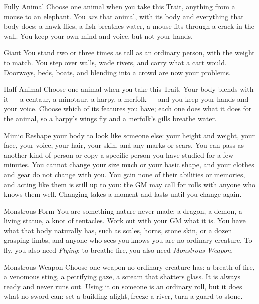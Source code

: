 \begin{feat}{Fully Animal}
Choose one animal when you take this Trait, anything from a mouse to an
elephant. You \emph{are} that animal, with its body and everything that
body does: a hawk flies, a fish breathes water, a mouse fits through a
crack in the wall. You keep your own mind and voice, but not your
hands.
\end{feat}

\begin{feat}{Giant}
You stand two or three times as tall as an ordinary person, with the
weight to match. You step over walls, wade rivers, and carry what a
cart would. Doorways, beds, boats, and blending into a crowd are now
your problems.
\end{feat}

\begin{feat}{Half Animal}
Choose one animal when you take this Trait. Your body blends with
it --- a centaur, a minotaur, a harpy, a merfolk --- and you keep your
hands and your voice. Choose which of its features you have; each one
does what it does for the animal, so a harpy's wings fly and a
merfolk's gills breathe water.
\end{feat}

\begin{feat}{Mimic}
Reshape your body to look like someone else: your height and weight,
your face, your voice, your hair, your skin, and any marks or scars.
You can pass as another kind of person or copy a specific person you
have studied for a few minutes. You cannot change your size much or
your basic shape, and your clothes and gear do not change with you.
You gain none of their abilities or memories, and acting like them is
still up to you: the GM may call for  rolls with anyone
who knows them well. Changing takes a moment and lasts until you
change again.
\end{feat}

\begin{feat}{Monstrous Form}
You are something nature never made: a dragon, a demon, a living
statue, a knot of tentacles. Work out with your GM what it is. You have
what that body naturally has, such as scales, horns, stone skin, or a
dozen grasping limbs, and anyone who sees you knows you are no ordinary
creature. To fly, you also need \emph{Flying}; to breathe fire, you
also need \emph{Monstrous Weapon}.
\end{feat}

\begin{feat}{Monstrous Weapon}
Choose one weapon no ordinary creature has: a breath of fire, a
venomous sting, a petrifying gaze, a scream that shatters glass. It is
always ready and never runs out. Using it on someone is an ordinary
roll, but it does what no sword can: set a building alight, freeze a
river, turn a guard to stone.
\end{feat}

